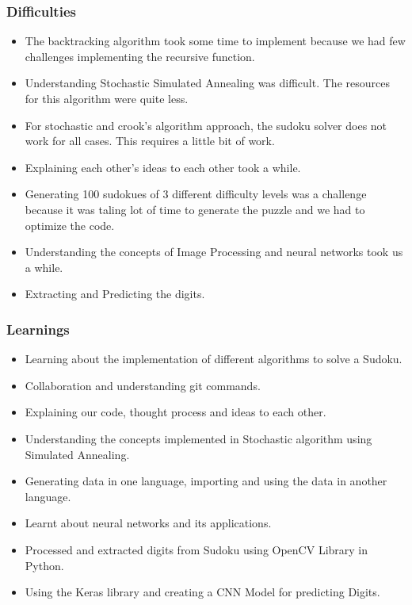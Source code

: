 \documentclass{beamer}
\begin{document}
\begin{frame}
     \frametitle{Difficulties}
     \begin{itemize}
          \item The backtracking algorithm took some time to implement because we had few challenges implementing the recursive function.
		  \item Understanding Stochastic Simulated Annealing was difficult. The resources for this algorithm were quite less.
	      \item For stochastic and crook's algorithm approach, the sudoku solver does not work for all cases. This requires a little bit of work.
		  \item Explaining each other's ideas to each other took a while.
		  \item Generating 100 sudokues of 3 different difficulty levels was a challenge because it was taling lot of time to generate the puzzle and we had to optimize the code.
		  \item Understanding the concepts of Image Processing and neural networks took us a while.
	      \item Extracting and Predicting the digits.
\end{itemize}
\end{frame}

\begin{frame}
     \frametitle{Learnings}
     \begin{itemize}
     \item Learning about the implementation of different algorithms to solve a Sudoku.
     \item Collaboration and understanding git commands.
	 \item Explaining our code, thought process and ideas to each other.
	 \item Understanding the concepts implemented in Stochastic algorithm using Simulated Annealing.
	 \item Generating data in one language, importing and using the data in another language.
	 \item Learnt about neural networks and its applications.
     \item Processed and extracted digits from Sudoku using OpenCV Library in Python.
	 \item Using the Keras library and creating a CNN Model for predicting Digits.
\end{itemize}         
\end{frame}
\end{document}
